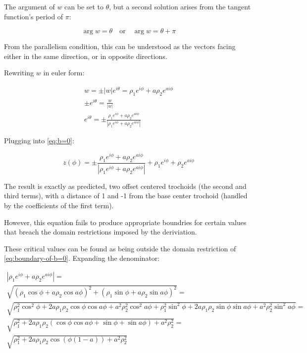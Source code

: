\documentclass[12pt, a4paper, oneside]{report}
\begin{document}
The argument of $w$ can be set to $\theta$, but a second solution arises from the tangent function's period of $\pi$:

\begin{equation*}
  \arg{w} = \theta \quad \text{or} \quad \arg{w} = \theta + \pi
\end{equation*}

From the parallelism condition, this can be understood as the vectors facing either in the same direction, or in opposite directions.

Rewriting $w$ in euler form:

\begin{gather*}
  w = \pm \left| w \right| e^{i \theta} = \rho_1 e^{i \phi} + a \rho_2 e^{a i \phi} \\
  \pm e^{i \theta} = \frac{w}{\left| w \right|} \\
  e^{i \theta} = \pm \frac{\rho_1 e^{i \phi} + a \rho_2 e^{a i \phi}}{\left| \rho_1 e^{i \phi} + a \rho_2 e^{a i \phi} \right|}
\end{gather*}

Plugging into \eqref{eq:b=0}:

\begin{equation*}
  z(\phi) = \pm \frac{\rho_1 e^{i \phi} + a \rho_2 e^{a i \phi}}{\left| \rho_1 e^{i \phi} + a \rho_2 e^{a i \phi} \right|} + \rho_1 e^{i \phi} + \rho_2 e^{a i \phi}
  \label{eq:boundary-of-b=0}
\end{equation*}

The result is exactly as predicted, two offset centered trochoids (the second and third terms), with a distance of 1 and -1 from the base center trochoid (handled by the coefficients of the first term).

However, this equation fails to produce appropriate boundries for certain values that breach the domain restrictions imposed by the deriviation.

These critical values can be found as being outside the domain restriction of \eqref{eq:boundary-of-b=0}. Expanding the denominator:

\begin{gather*}
  \left| \rho_1 e^{i \phi} + a \rho_2 e^{a i \phi} \right| = \\
  \sqrt{(\rho_1 \cos \phi + a \rho_2 \cos a \phi) ^ 2 + (\rho_1 \sin \phi + a \rho_2 \sin a \phi) ^ 2} = \\
  \sqrt{\rho_1 ^ 2 \cos ^ 2 \phi + 2 a \rho_1 \rho_2 \cos \phi \cos a \phi + a ^ 2 \rho_2 ^ 2 \cos ^ 2 a \phi + \rho_1 ^ 2 \sin ^ 2 \phi + 2 a \rho_1 \rho_2 \sin \phi \sin a \phi + a ^ 2 \rho_2 ^ 2 \sin ^ 2 a \phi} = \\
  \sqrt{\rho_1 ^ 2 + 2 a \rho_1 \rho_2 (\cos \phi \cos a \phi + \sin \phi + \sin a \phi) + a ^ 2 \rho_2 ^ 2} = \\
  \sqrt{\rho_1 ^ 2 + 2 a \rho_1 \rho_2 \cos(\phi(1 - a)) + a ^ 2 \rho_2 ^ 2}
\end{gather*}
\end{document}
